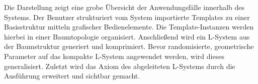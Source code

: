 Die Darstellung zeigt eine grobe Übersicht der Anwendungsfälle innerhalb des Systems.
Der Benutzer strukturiert vom System importierte Templates zu einer Basisstruktur mitteln grafischer Bedienelemente.
Die Template-Instanzen werden hierbei in einer Baumtopologie organisiert.
Anschließend wird ein L-System aus der Baumstruktur generiert und komprimiert.
Bevor randomisierte, geometrische Parameter auf das kompakte L-System angewendet werden, wird dieses generalisiert.
Zuletzt wird das Axiom des abgeleiteten L-Systems durch die Ausführung erweitert und sichtbar gemacht.